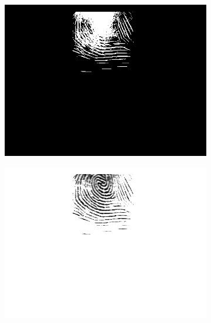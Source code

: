 \documentclass{beamer}
\begin{document}
{\begin{figure}[!ht]
\begin{subfigure}[ht]{0.15\textwidth}
            \includegraphics[width=\textwidth]{fingerprints/2004Db1a/1_1_mask.jpg}
        \end{subfigure}
        \qquad
        \begin{subfigure}[ht]{0.15\textwidth}
            \includegraphics[width=\textwidth]{fingerprints/2004Db1a/1_1_filtered.jpg}
        \end{subfigure}
    \end{figure}
    \begin{figure}[!ht]
        \centering
        \begin{subfigure}[ht]{0.15\textwidth}

\end{subfigure}
\end{figure}}
\end{document}
